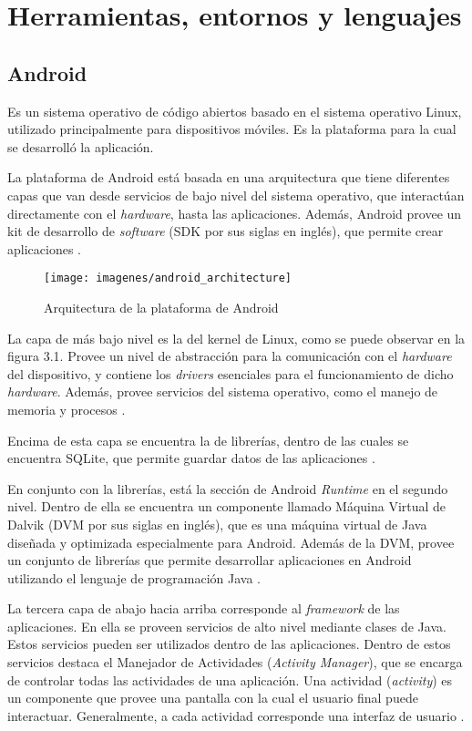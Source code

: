\section{Herramientas, entornos y lenguajes} \label{Herramientas, entornos y lenguajes}


\subsection{Android}
Es un sistema operativo de código abiertos basado en el sistema operativo Linux, utilizado principalmente para dispositivos móviles\cite{AND1}. Es la plataforma para la cual se desarrolló la aplicación. 

La plataforma de Android está basada en una arquitectura que tiene diferentes capas que van desde servicios de bajo nivel del sistema operativo, que interactúan directamente con el \textit{hardware}, hasta las aplicaciones. Además, Android provee un kit de desarrollo de \textit{software} (SDK por sus siglas en inglés), que permite crear aplicaciones \cite{AND3}.

\begin{figure}[ht]
  \centering
  \texttt{[image: imagenes/android\_architecture]}
  \caption{Arquitectura de la plataforma de Android}
  \label{fig:androidArchitecture}
\end{figure}

La capa de más bajo nivel es la del kernel de Linux, como se puede observar en la figura 3.1. Provee un nivel de abstracción para la comunicación con el \textit{hardware} del dispositivo, y contiene los \textit{drivers} esenciales para el funcionamiento de dicho \textit{hardware}. Además, provee servicios del sistema operativo, como el manejo de memoria y procesos \cite{AND3}.

Encima de esta capa se encuentra la de librerías, dentro de las cuales se encuentra SQLite, que permite guardar datos de las aplicaciones \cite{AND3}.

En conjunto con la librerías, está la sección de Android \textit{Runtime} en el segundo nivel. Dentro de ella se encuentra un componente llamado Máquina Virtual de Dalvik (DVM por sus siglas en inglés), que es una máquina virtual de Java diseñada y optimizada especialmente para Android. Además de la DVM, provee un conjunto de librerías que permite desarrollar aplicaciones en Android utilizando el lenguaje de programación Java \cite{AND3}.

La tercera capa de abajo hacia arriba corresponde al \textit{framework} de las aplicaciones. En ella se proveen servicios de alto nivel mediante clases de Java. Estos servicios pueden ser utilizados dentro de las aplicaciones. Dentro de estos servicios destaca el Manejador de Actividades (\textit{Activity Manager}), que se encarga de controlar todas las actividades de una aplicación. Una actividad (\textit{activity}) es un componente que provee una pantalla con la cual el usuario final puede interactuar. Generalmente, a cada actividad corresponde una interfaz de usuario \cite{AND3}.

